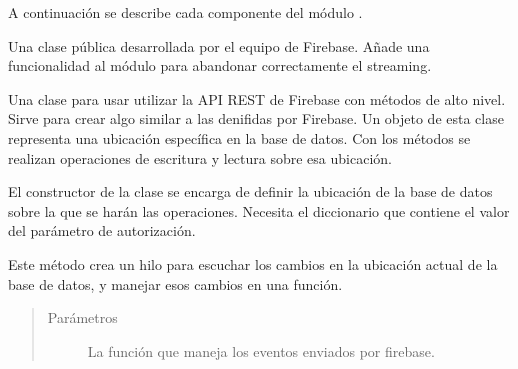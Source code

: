 A continuación se describe cada componente del módulo .




Una clase pública desarrollada por el equipo de Firebase.
Añade una funcionalidad al módulo  para
abandonar correctamente el streaming.


Una clase para usar utilizar la API REST de Firebase con métodos de alto nivel.
Sirve para crear algo similar a las  denifidas por Firebase.
Un objeto de esta clase representa una ubicación específica en la base de datos.
Con los métodos se realizan operaciones de escritura y lectura sobre esa ubicación.

El constructor de la clase se encarga de definir la ubicación de la base de datos
sobre la que se harán las operaciones.
Necesita el diccionario  que contiene el valor del parámetro de autorización.

\begin{fulllineitems}
\end{fulllineitems}


Este método crea un hilo para escuchar los cambios en la ubicación actual
de la base de datos, y manejar esos cambios en una función.
\begin{quote}\begin{description}
\item[{Parámetros}] \leavevmode
{} \textendash{} La función que maneja los eventos enviados por firebase.

\end{description}\end{quote}


